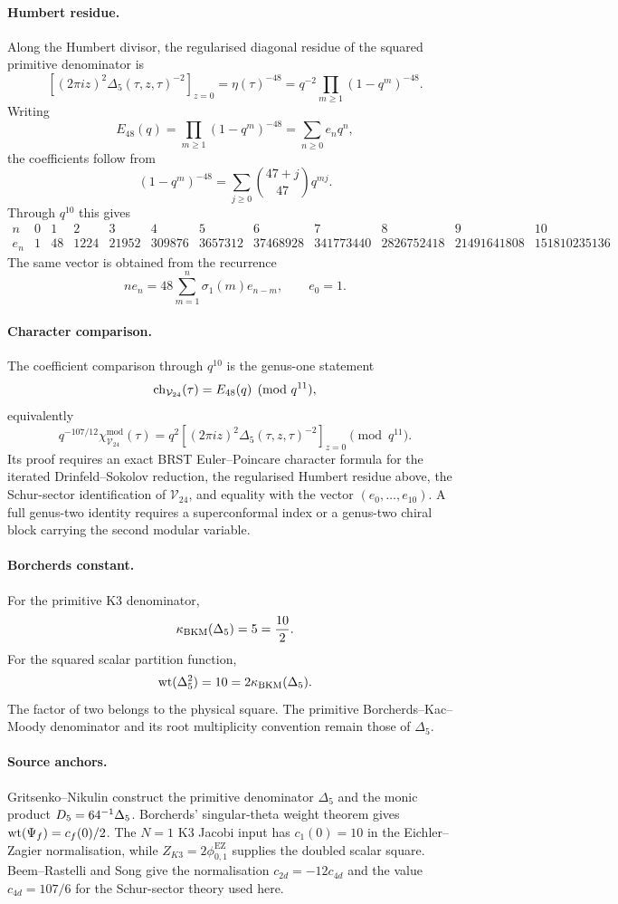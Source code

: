 \paragraph{Humbert residue.}
Along the Humbert divisor, the regularised diagonal residue of the
squared primitive denominator is
\[
  \left[(2\pi iz)^2\Delta_5(\tau,z,\tau)^{-2}\right]_{z=0}
  =
  \eta(\tau)^{-48}
  =
  q^{-2}\prod_{m\geq 1}(1-q^m)^{-48}.
\]
Writing
\[
  E_{48}(q)=\prod_{m\geq 1}(1-q^m)^{-48}
  =\sum_{n\geq 0}e_nq^n,
\]
the coefficients follow from
\[
  (1-q^m)^{-48}
  =
  \sum_{j\geq 0}\binom{47+j}{47}q^{mj}.
\]
Through $q^{10}$ this gives
\[
\begin{array}{c|rrrrrrrrrrr}
n&0&1&2&3&4&5&6&7&8&9&10\\ \hline
e_n&
1&48&1224&21952&309876&3657312&37468928&
341773440&2826752418&21491641808&151810235136
\end{array}
\]
The same vector is obtained from the recurrence
\[
  n e_n
  =
  48\sum_{m=1}^{n}\sigma_1(m)e_{n-m},
  \qquad e_0=1.
\]

\paragraph{Character comparison.}
The coefficient comparison through $q^{10}$ is the genus-one statement
\[
  \operatorname{ch}_{\mathcal V_{24}}(\tau)
  =
  E_{48}(q)
  \pmod{q^{11}},
\]
equivalently
\[
  q^{-107/12}\chi^{\mathrm{mod}}_{\mathcal V_{24}}(\tau)
  =
  q^2\left[(2\pi iz)^2\Delta_5(\tau,z,\tau)^{-2}\right]_{z=0}
  \pmod{q^{11}} .
\]
Its proof requires an exact BRST Euler--Poincare character formula for
the iterated Drinfeld--Sokolov reduction, the regularised Humbert
residue above, the Schur-sector identification of
$\mathcal V_{24}$, and equality with the vector
$(e_0,\ldots,e_{10})$.  A full genus-two identity requires a
superconformal index or a genus-two chiral block carrying the second
modular variable.

\paragraph{Borcherds constant.}
For the primitive K3 denominator,
\[
  \kappa_{\mathrm{BKM}}(\Delta_5)=5=\frac{10}{2}.
\]
For the squared scalar partition function,
\[
  \mathrm{wt}(\Delta_5^2)=10=2\kappa_{\mathrm{BKM}}(\Delta_5).
\]
The factor of two belongs to the physical square.  The primitive
Borcherds--Kac--Moody denominator and its root multiplicity convention
remain those of $\Delta_5$.

\paragraph{Source anchors.}
Gritsenko--Nikulin construct the primitive denominator $\Delta_5$ and
the monic product $D_5=64^{-1}\Delta_5$.  Borcherds'
singular-theta weight theorem gives $\mathrm{wt}(\Psi_f)=c_f(0)/2$.  The
$N=1$ K3 Jacobi input has $c_1(0)=10$ in the Eichler--Zagier
normalisation, while $Z_{K3}=2\phi_{0,1}^{\mathrm{EZ}}$ supplies the
doubled scalar square.  Beem--Rastelli and Song give the normalisation
$c_{2d}=-12c_{4d}$ and the value $c_{4d}=107/6$ for the Schur-sector
theory used here.

